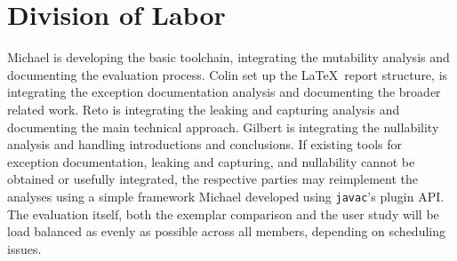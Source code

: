 
\section{Division of Labor}

Michael is developing the basic toolchain, integrating the mutability analysis
and documenting the evaluation process. Colin set up the \LaTeX~report
structure, is integrating the exception documentation analysis and documenting
the broader related work. Reto is integrating the leaking and capturing
analysis and documenting the main technical approach. Gilbert is integrating
the nullability analysis and handling introductions and conclusions. If
existing tools for exception documentation, leaking and capturing, and
nullability cannot be obtained or usefully integrated, the respective parties
may reimplement the analyses using a simple framework Michael developed using
\texttt{javac}'s plugin API.  The evaluation itself, both the exemplar
comparison and the user study will be load balanced as evenly as possible across
all members, depending on scheduling issues.

